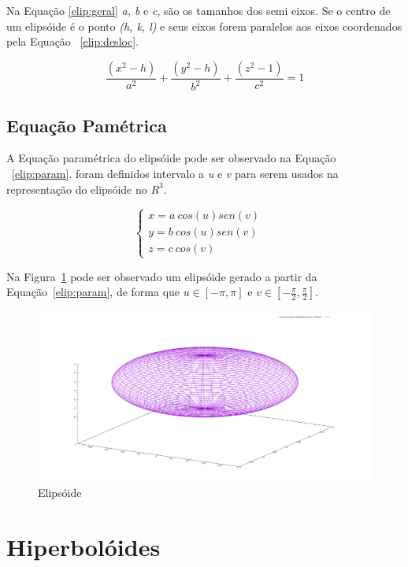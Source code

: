 \documentclass[
	article,			%
	11pt,				%
	oneside,			%
	a4paper,			%
	english,			%
	brazil,				%
	]{abntex2}
\begin{document}
		Na Equação \ref{elip:geral} \emph{a, b} e \emph{c}, são os tamanhos dos
		semi eixos. Se o centro de um elipsóide é o ponto \emph{(h, k, l)} e
		seus eixos forem paralelos aos eixos coordenados pela Equação
		~\ref{elip:desloc}.

		\begin{equation}\label{elip:desloc}
			\frac{(x^2-h)}{a^2}+\frac{(y^2-h)}{b^2}+\frac{(z^2-1)}{c^2}=1
		\end{equation}


		\subsection{Equação Pamétrica}

		A Equação paramétrica do elipsóide pode ser observado na Equação
		~\ref{elip:param}. foram definidos intervalo a \emph{u} e \emph{v} para
		serem usados na representação do elipsóide no $R^3$.
		
		\begin{equation}\label{elip:param}
			\begin{cases}
				x = a\ cos(u) sen(v) &~\\
				y = b\ cos(u) sen(v) &~\\
				z = c\ cos(v) 
			\end{cases}
		\end{equation}


		Na Figura~\ref{img:elip} pode ser observado um elipsóide gerado a partir
		da Equação~\ref{elip:param}, de forma que $u\in[-\pi,\pi]$ e
		$v\in[-\frac{\pi}{2}, \frac{\pi}{2}]$.

		\begin{figure}[!htb]
			\includegraphics[width=\textwidth,keepaspectratio]{ellipsoid.png}
			\caption{Elipsóide}
			\label{img:elip}
		\end{figure}

	\section{Hiperbolóides} 
\end{document}
